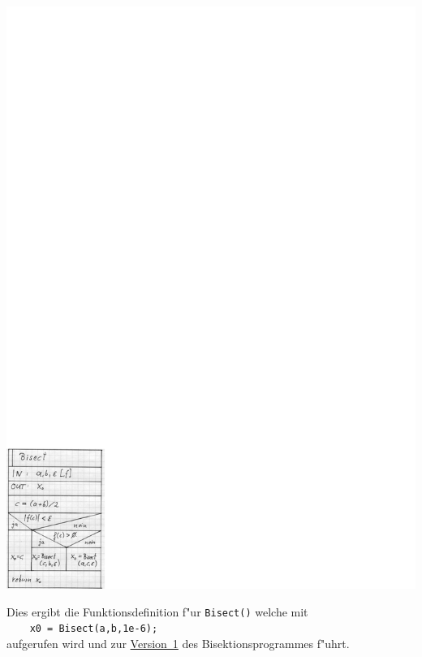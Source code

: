 \includegraphics[scale=0.7]{GIF/p85}

Dies ergibt die Funktionsdefinition f"ur \verb|Bisect()| welche
mit
\\
\verb|    x0 = Bisect(a,b,1e-6);|
\\
aufgerufen wird und zur \underline{Version~1} des Bisektionsprogrammes f"uhrt.
%
%

